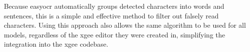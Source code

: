 Because easy\acrshort{ocr} automatically groups detected characters into words and sentences, this is a simple and effective method to filter out falsely read characters. Using this approach also allows the same algorithm to be used for all models, regardless of the \acrshort{xgee} editor they were created in, simplifying the integration into the \acrshort{xgee} codebase.